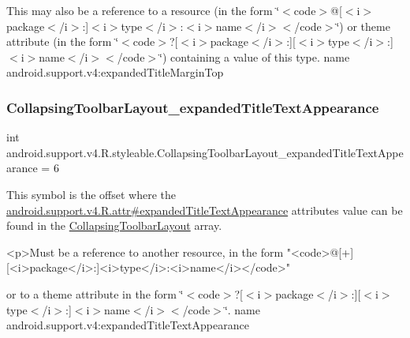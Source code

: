 This may also be a reference to a resource (in the form \char`\"{}$<$code$>$@\mbox{[}$<$i$>$package$<$/i$>$\+:\mbox{]}$<$i$>$type$<$/i$>$\+:$<$i$>$name$<$/i$>$$<$/code$>$\char`\"{}) or theme attribute (in the form \char`\"{}$<$code$>$?\mbox{[}$<$i$>$package$<$/i$>$\+:\mbox{]}\mbox{[}$<$i$>$type$<$/i$>$\+:\mbox{]}$<$i$>$name$<$/i$>$$<$/code$>$\char`\"{}) containing a value of this type.  name android.\+support.\+v4\+:expanded\+Title\+Margin\+Top \mbox{\label{classandroid_1_1support_1_1v4_1_1R_1_1styleable_ad9258f77de37879142ccb6e7d0c1c841}} 
\subsubsection{\texorpdfstring{Collapsing\+Toolbar\+Layout\+\_\+expanded\+Title\+Text\+Appearance}{CollapsingToolbarLayout\_expandedTitleTextAppearance}}
{\footnotesize\ttfamily int android.\+support.\+v4.\+R.\+styleable.\+Collapsing\+Toolbar\+Layout\+\_\+expanded\+Title\+Text\+Appearance = 6\hspace{0.3cm}{\ttfamily [static]}}

This symbol is the offset where the \hyperlink{classandroid_1_1support_1_1v4_1_1R_1_1attr_a69dbcfdcd006db32b95a1424ebe2dd94}{android.\+support.\+v4.\+R.\+attr\#expanded\+Title\+Text\+Appearance} attribute\textquotesingle{}s value can be found in the \hyperlink{classandroid_1_1support_1_1v4_1_1R_1_1styleable_a91b20e27088c910353d38c1efde32aa9}{Collapsing\+Toolbar\+Layout} array.

\begin{DoxyVerb}      <p>Must be a reference to another resource, in the form "<code>@[+][<i>package</i>:]<i>type</i>:<i>name</i></code>"
\end{DoxyVerb}
 or to a theme attribute in the form \char`\"{}$<$code$>$?\mbox{[}$<$i$>$package$<$/i$>$\+:\mbox{]}\mbox{[}$<$i$>$type$<$/i$>$\+:\mbox{]}$<$i$>$name$<$/i$>$$<$/code$>$\char`\"{}.  name android.\+support.\+v4\+:expanded\+Title\+Text\+Appearance \mbox{\label{classandroid_1_1support_1_1v4_1_1R_1_1styleable_a0d19b1379e73d24050b61fe835c56593}} 
